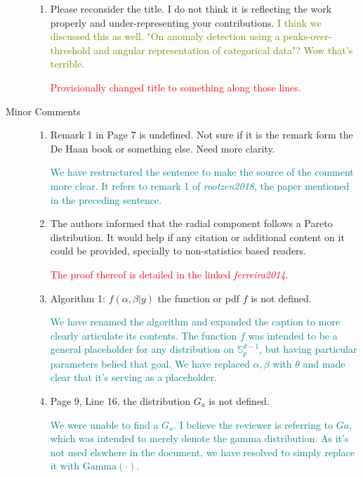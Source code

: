 \documentclass{article}
\newcommand{\comment}[1]{\textcolor{olive}{#1}}
\newcommand{\response}[1]{\textcolor{teal}{#1}}
\newcommand{\makenote}[1]{\textcolor{red}{#1}}
\begin{document}
\begin{description}
\begin{enumerate}
        \item Please reconsider the title. I do not think it is reflecting the work properly 
            and under-representing your contributions.
            \comment{I think we discussed this as well.  "On anomaly detection using a 
                peaks-over-threshold and angular representation of categorical data"?  
                Wow that's terrible.}
            
            \makenote{Provisionally changed title to something along those lines.}
    
    \end{enumerate}
    \item[Minor Comments]
    \begin{enumerate}
        \item Remark 1 in Page 7 is undefined. Not sure if it is the remark form the De Haan book 
            or something else. Need more clarity.

            \response{We have restructured the sentence to make the source of the comment more clear.  
            It refers to remark 1 of \emph{rootzen2018}, the paper mentioned in the preceding sentence.}

        \item The authors informed that the radial component follows a Pareto distribution. It 
            would help if any citation or additional content on it could be provided, specially 
            to non-statistics based readers. 

            \makenote{The proof thereof is detailed in the linked \emph{ferreira2014}}.

        \item Algorithm 1: $f(\alpha, \beta | y)$ the function or pdf $f$ is not defined.

            \response{We have renamed the algorithm and expanded the caption to more clearly articulate
                its contents.  The function $f$ was intended to be a general placeholder for any
                distribution on $\mathbb{S}_p^{d-1}$, but having particular parameters belied that goal.
                We have replaced $\alpha,\beta$ with $\theta$ and made clear that it's serving as a
                placeholder.}

        \item Page 9, Line 16, the distribution $G_a$ is not defined.

            \response{We were unable to find a $G_a$.  I believe the reviewer is referring to $Ga$,
            which was intended to merely denote the gamma distribution.  As it's not used elswhere
            in the document, we have resolved to simply replace it with $\text{Gamma}(\cdot)$.}


\end{enumerate}
\end{description}
\end{document}
